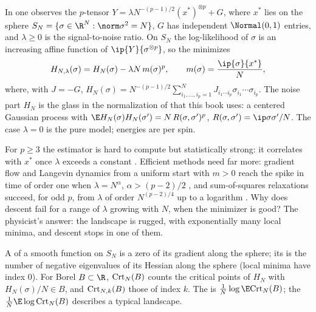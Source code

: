 \begin{refsection}
In  \parencite{MontanariRichard2014} one observes the $p$-tensor $Y=\lambda N^{-(p-1)/2}(x^*)^{\otimes p}+G$, where $x^*$ lies on the sphere $S_N=\{\sigma\in\R^N:\norm\sigma^2=N\}$, $G$ has independent $\Normal(0,1)$ entries, and $\lambda\ge0$ is the signal-to-noise ratio. On $S_N$ the log-likelihood of $\sigma$ is an increasing affine function of $\ip{Y}{\sigma^{\otimes p}}$, so the  minimizes
\begin{equation}\label{eq:kacrice:spiked}
H_{N,\lambda}(\sigma)=H_N(\sigma)-\lambda N\,m(\sigma)^p,\qquad m(\sigma)=\frac{\ip{\sigma}{x^*}}N,
\end{equation}
where, with $J=-G$,
$H_N(\sigma)=N^{-(p-1)/2}\sum_{i_1,\dots,i_p=1}^NJ_{i_1\cdots i_p}\sigma_{i_1}\cdots\sigma_{i_p}$. The noise part $H_N$ is the  glass in the normalization of \textcite{AuffingerBenArousCerny2013} that this book uses: a centered Gaussian process with $\E H_N(\sigma)H_N(\sigma')=N\,R(\sigma,\sigma')^p$, $R(\sigma,\sigma')=\ip\sigma{\sigma'}/N$. The case $\lambda=0$ is the pure model; energies are per spin.

For $p\ge3$ the estimator is hard to compute but statistically strong: it correlates with $x^*$ once $\lambda$ exceeds a constant \parencite{JagannathLopattoMiolane2020}. Efficient methods need far more: gradient flow and Langevin dynamics from a uniform start with $m>0$ reach the spike in time of order one when $\lambda=N^\alpha$, $\alpha>(p-2)/2$ \parencite[Theorem~2.1]{BenArousGheissariJagannath2020}, and sum-of-squares relaxations succeed, for odd $p$, from $\lambda$ of order $N^{(p-2)/4}$ up to a logarithm \parencite{HopkinsShiSteurer2015}. Why does descent fail for a range of $\lambda$ growing with $N$, when the minimizer is good? The physicist's answer: the landscape is rugged, with exponentially many local minima, and descent stops in one of them.

A  of a smooth function on $S_N$ is a zero of its gradient along the sphere; its  is the number of negative eigenvalues of its Hessian along the sphere (local minima have index $0$). For Borel $B\subset\R$, $\mathrm{Crt}_N(B)$ counts the critical points of $H_N$ with $H_N(\sigma)/N\in B$, and $\mathrm{Crt}_{N,k}(B)$ those of index $k$. The  is $\frac1N\log\E\kacriceCrt_N(B)$; the  $\frac1N\E\log\kacriceCrt_N(B)$ describes a typical landscape.


\end{refsection}
